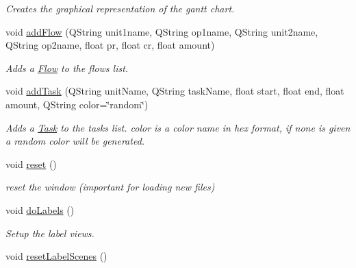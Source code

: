 \begin{DoxyCompactItemize}
\begin{DoxyCompactList}\small\item\em Creates the graphical representation of the gantt chart. \end{DoxyCompactList}\item 
\hypertarget{class_main_window_a645f1cd085c2636dc4eccb320455a6f4}{}void \hyperlink{class_main_window_a645f1cd085c2636dc4eccb320455a6f4}{add\+Flow} (Q\+String unit1name, Q\+String op1name, Q\+String unit2name, Q\+String op2name, float pr, float cr, float amount)\label{class_main_window_a645f1cd085c2636dc4eccb320455a6f4}

\begin{DoxyCompactList}\small\item\em Adds a \hyperlink{struct_flow}{Flow} to the flows list. \end{DoxyCompactList}\item 
\hypertarget{class_main_window_a2920d5c6c64925cb5f87c7fdac3f54b0}{}void \hyperlink{class_main_window_a2920d5c6c64925cb5f87c7fdac3f54b0}{add\+Task} (Q\+String unit\+Name, Q\+String task\+Name, float start, float end, float amount, Q\+String color=\char`\"{}random\char`\"{})\label{class_main_window_a2920d5c6c64925cb5f87c7fdac3f54b0}

\begin{DoxyCompactList}\small\item\em Adds a \hyperlink{struct_task}{Task} to the tasks list. color is a color name in hex format, if none is given a random color will be generated. \end{DoxyCompactList}\item 
\hypertarget{class_main_window_a02076de46e6810174817ebfc6ddd2be5}{}void \hyperlink{class_main_window_a02076de46e6810174817ebfc6ddd2be5}{reset} ()\label{class_main_window_a02076de46e6810174817ebfc6ddd2be5}

\begin{DoxyCompactList}\small\item\em reset the window (important for loading new files) \end{DoxyCompactList}\item 
\hypertarget{class_main_window_a46f95f01be8aeeea1a828a8a1a8f1706}{}void \hyperlink{class_main_window_a46f95f01be8aeeea1a828a8a1a8f1706}{do\+Labels} ()\label{class_main_window_a46f95f01be8aeeea1a828a8a1a8f1706}

\begin{DoxyCompactList}\small\item\em Setup the label views. \end{DoxyCompactList}\item 
\hypertarget{class_main_window_af169d161884483a84742241bb3fedc5f}{}void \hyperlink{class_main_window_af169d161884483a84742241bb3fedc5f}{reset\+Label\+Scenes} ()\label{class_main_window_af169d161884483a84742241bb3fedc5f}


\end{DoxyCompactItemize}
